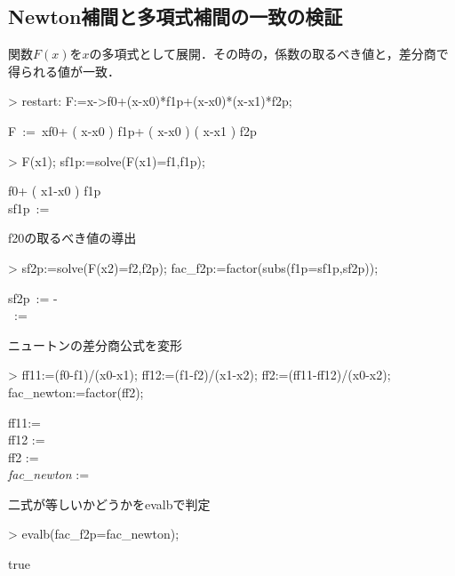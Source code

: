 \subsection{Newton補間と多項式補間の一致の検証}
関数$F(x)$を$x$の多項式として展開．その時の，係数の取るべき値と，差分商で得られる値が一致．
\begin{MapleInput}
> restart: F:=x->f0+(x-x0)*f1p+(x-x0)*(x-x1)*f2p;
\end{MapleInput}
\begin{MapleOutput}
F\, := \,x\mapsto f0+ ( x-x0 ) f1p+ ( x-x0 )  ( x-x1 ) f2p
\end{MapleOutput}
\begin{MapleInput}
> F(x1); 
  sf1p:=solve(F(x1)=f1,f1p);
\end{MapleInput}
\begin{MapleOutputGather}
f0+ ( x1-x0 ) f1p \notag \\
\displaystyle sf1p\, := \,{} \notag
\end{MapleOutputGather}
f20の取るべき値の導出
\begin{MapleInput}
> sf2p:=solve(F(x2)=f2,f2p); 
  fac_f2p:=factor(subs(f1p=sf1p,sf2p));
\end{MapleInput}
\begin{MapleOutputGather}
sf2p\, := \displaystyle -{} \notag \\
\, :=  \notag
\end{MapleOutputGather}
ニュートンの差分商公式を変形
\begin{MapleInput}
> ff11:=(f0-f1)/(x0-x1); 
  ff12:=(f1-f2)/(x1-x2); 
  ff2:=(ff11-ff12)/(x0-x2);
  fac_newton:=factor(ff2);
\end{MapleInput}
\begin{MapleOutputGather}
ff11:= {\displaystyle {}} \notag \\
ff12 := {\displaystyle {}} \notag \\
ff2 :=  \notag \\
{\it fac\_newton} := {\displaystyle {}} \notag 
\end{MapleOutputGather}

二式が等しいかどうかをevalbで判定
\begin{MapleInput}
> evalb(fac_f2p=fac_newton);
\end{MapleInput}
\begin{MapleOutput}
true
\end{MapleOutput}
